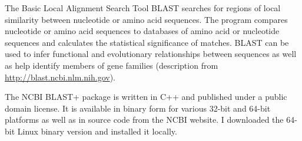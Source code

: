 The Basic Local Alignment Search Tool BLAST \citep{altschul1990} searches for
regions of local similarity between nucleotide or amino acid sequences. The
program compares nucleotide or amino acid sequences to databases of amino acid
or nucleotide sequences and calculates the statistical significance of matches.
BLAST can be used to infer functional and evolutionary relationships between
sequences as well as help identify members of gene families (description from
\url{http://blast.ncbi.nlm.nih.gov}).

The NCBI BLAST+ package is written in C++ and published under a public domain
license. It is available in binary form for various 32-bit and 64-bit platforms
as well as in source code from the NCBI website. I downloaded the 64-bit Linux
binary version and installed it locally.
